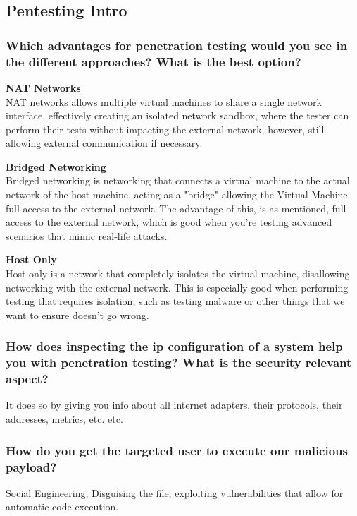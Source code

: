 \subsection{Pentesting Intro}
\subsubsection{Which advantages for penetration testing would you see in the different approaches? What is the best option?}

\textbf{NAT Networks}\\
NAT networks allows multiple virtual machines to share a single network interface, effectively creating an isolated network sandbox, where the tester can perform their tests without impacting the external network, however, still allowing external communication if necessary.

\textbf{Bridged Networking}\\
Bridged networking is networking that connects a virtual machine to the actual network of the host machine, acting as a "bridge" allowing the Virtual Machine full access to the external network. The advantage of this, is as mentioned, full access to the external network, which is good when you're testing advanced scenarios that mimic real-life attacks.

\textbf{Host Only}\\
Host only is a network that completely isolates the virtual machine, disallowing networking with the external network. This is especially good when performing testing that requires isolation, such as testing malware or other things that we want to ensure doesn't go wrong.

\subsubsection{How does inspecting the ip configuration of a system help you with penetration testing? What is the security relevant aspect?}
It does so by giving you info about all internet adapters, their protocols, their addresses, metrics, etc. etc.

\subsubsection{How do you get the targeted user to execute our malicious payload?}
Social Engineering, Disguising the file, exploiting vulnerabilities that allow for automatic code execution.

